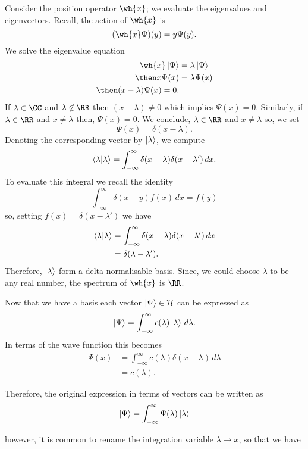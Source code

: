 \documentclass[12pt, a4paper]{article}
\begin{document}
\begin{example}
    Consider the position operator \(\wh{x}\); we evaluate the eigenvalues and eigenvectors. Recall, the action of \(\wh{x}\) is 
    \[(\wh{x} \Psi)(y)= y\Psi(y).\]
    We solve the eigenvalue equation 
    \[\begin{aligned}
        \wh{x} \ket{\Psi} &= \lambda \ket{\Psi} \\
        \then x\Psi(x) &= \lambda \Psi(x) \\
        \then (x-\lambda) \Psi(x) =0. 
    \end{aligned}\]
    If \(\lambda \in \CC\) and \(\lambda \not\in \RR\) then \((x-\lambda) \neq 0\) which implies \(\Psi(x)=0\). Similarly, if \(\lambda \in \RR\) and \(x \neq \lambda\) then, \(\Psi(x)=0\). We conclude, \(\lambda \in \RR\) and \(x \neq \lambda\) so, we set 
    \[\Psi(x) =\delta(x-\lambda).\]
    Denoting the corresponding vector by \(\ket{\lambda}\), we compute 
    \[\bra{\lambda} \ket{\lambda} = \int_{-\infty}^{\infty} \delta(x-\lambda)\delta(x-\lambda')\, dx.\]
    To evaluate this integral we recall the identity
    \[\int_{-\infty}^{\infty} \delta(x-y)f(x) \, dx =f(y)\]
    so, setting \(f(x)=\delta(x-\lambda')\) we have 
    \[\begin{aligned}
        \bra{\lambda} \ket{\lambda} &= \int_{-\infty}^{\infty} \delta(x-\lambda)\delta(x-\lambda')\, dx \\
        &= \delta(\lambda-\lambda').
    \end{aligned}\]
    Therefore, \(\ket{\lambda}\) form a delta-normalisable basis. Since, we could choose \(\lambda\) to be any real number, the spectrum of \(\wh{x}\) is \(\RR\).
    
    Now that we have a basis each vector \(\ket{\Psi} \in \mathcal{H}\) can be expressed as 
    \[\ket{\Psi} = \int_{-\infty}^{\infty} c(\lambda) \ket{\lambda} \, d\lambda.\]
    In terms of the wave function this becomes 
    \[\begin{aligned}
        \Psi(x) &= \int_{-\infty}^{\infty} c(\lambda) \delta(x-\lambda) \, d\lambda \\
        &= c(\lambda).
    \end{aligned}\]
\end{example}

Therefore, the original expression in terms of vectors can be written as 
\[\ket{\Psi} = \int_{-\infty}^{\infty} \Psi(\lambda) \ket{\lambda}\]

however, it is common to rename the integration variable \(\lambda \to x\), so that we have 
\end{document}
